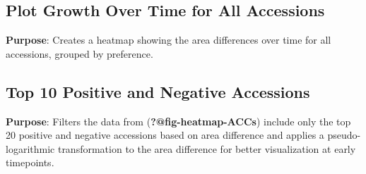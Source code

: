 \documentclass[
  11pt,
]{article}
\begin{document}
\subsection{Plot Growth Over Time for All
Accessions}\label{plot-growth-over-time-for-all-accessions}

\textbf{Purpose}: Creates a heatmap showing the area differences over
time for all accessions, grouped by preference.

\subsection{Top 10 Positive and Negative
Accessions}\label{top-10-positive-and-negative-accessions}

\textbf{Purpose}: Filters the data from (\textbf{?@fig-heatmap-ACCs})
include only the top 20 positive and negative accessions based on area
difference and applies a pseudo-logarithmic transformation to the area
difference for better visualization at early timepoints.
\end{document}
